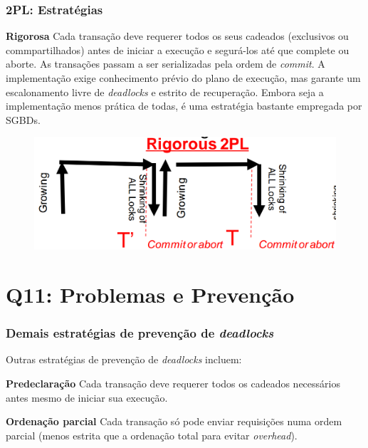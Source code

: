 \documentclass{beamer}
\begin{document}
\begin{frame} %
    \frametitle{2PL: Estratégias}
    \begin{block}{\textbf{Rigorosa}}
        Cada transação deve requerer todos os seus cadeados (exclusivos ou commpartilhados) antes de iniciar a execução e segurá-los até que complete ou aborte. As transações passam a ser serializadas pela ordem de \emph{commit}. A implementação exige conhecimento prévio do plano de execução, mas garante um escalonamento livre de \emph{deadlocks} e estrito de recuperação. Embora seja a implementação menos prática de todas, é uma estratégia bastante empregada por SGBDs.

        \medskip
        \begin{figure}
            \includegraphics[width=0.65\linewidth]{rigorous2pl.png}
        \end{figure}
    \end{block}
\end{frame}

\section{Q11: Problemas e Prevenção}


\begin{frame} %
    \frametitle{Demais estratégias de prevenção de \emph{deadlocks}}
    Outras estratégias de prevenção de \emph{deadlocks} incluem:

    \medskip
    \begin{block}{\textbf{Predeclaração}}
        Cada transação deve requerer todos os cadeados necessários antes mesmo de iniciar sua execução.
    \end{block}

    \medskip
    \begin{block}{\textbf{Ordenação parcial}}
        Cada transação só pode enviar requisições numa ordem parcial (menos estrita que a ordenação total para evitar \emph{overhead}).
    \end{block}
\end{frame}
\end{document}
